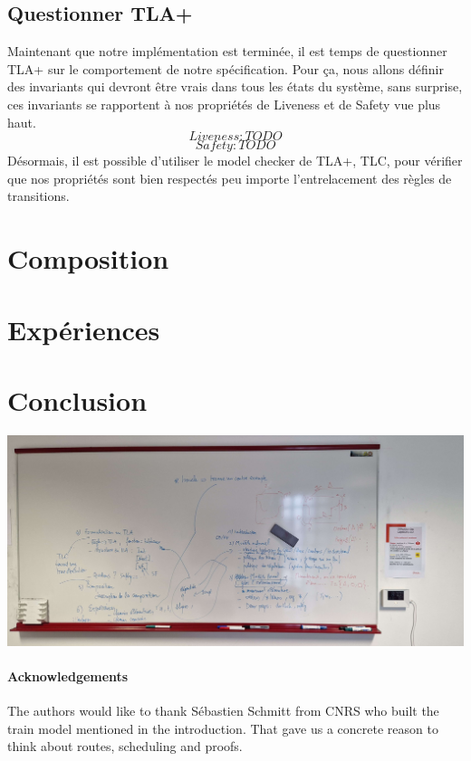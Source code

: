 \documentclass[runningheads]{llncs}
\begin{document}
\subsection{Questionner TLA+}
Maintenant que notre implémentation est terminée, il est temps de questionner TLA+ sur le comportement de notre spécification.
Pour ça, nous allons définir des invariants qui devront être vrais dans tous les états du système, sans surprise, ces invariants 
se rapportent à nos propriétés de Liveness et de Safety vue plus haut.
$$Liveness : TODO$$
$$Safety : TODO$$
Désormais, il est possible d'utiliser le model checker de TLA+, TLC, pour vérifier que nos propriétés sont bien respectés
peu importe l'entrelacement des règles de transitions.


\section{Composition}
\label{sec:composition}

\section{Expériences}
\label{sec:experiments}


\section{Conclusion}
\label{sec:conclusion}

\includegraphics[scale=0.1]{img/sommaire_tableau.jpg}

\paragraph{Acknowledgements} The authors would like to thank Sébastien Schmitt from CNRS who built the train model mentioned in the introduction. That gave us a concrete reason to think about routes, scheduling and proofs. 



\end{document}
